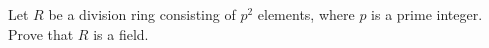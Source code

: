 \documentclass{article}
\begin{document}
Let \(R\) be a division ring consisting of \(p^2\) elements, where \(p\) is a prime integer. Prove that \(R\) is a field.
\end{document}
